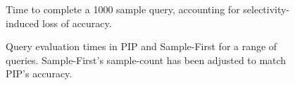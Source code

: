 

\begin{figure}
\begin{center}
%
\caption{Time to complete a 1000 sample query, accounting for selectivity-induced loss of accuracy.}
\label{fig:scaling_selectivity}
\end{center}
\vspace*{-0.3in}
\end{figure}


\begin{figure}
\begin{center}
\caption{Query evaluation times in PIP and Sample-First for a range of queries.  Sample-First's sample-count has been adjusted to match PIP's accuracy.}
\label{fig:querytimings}
\end{center}
\vspace*{-0.3in}
\end{figure}

